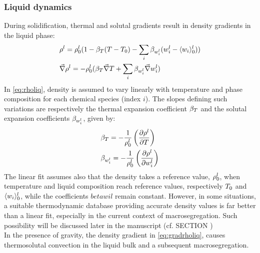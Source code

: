 \subsubsection*{Liquid dynamics}
During solidification, thermal and solutal gradients result in density gradients in the liquid phase: 
\begin{subequations}
\begin{align}
\label{eq:rholiq}
& \rho^l = \rho_{0}^{l} ( 1 - \beta_T (T - T_{0}) - \sum_{i} \beta_{w_i^l} (w_i^l - \langle w_i \rangle_{0}^l) )  \\ 
\label{eq:gradrholiq}
& \vec{\nabla}\rho^l = -\rho_{0}^{l} (  \beta_T \vec{\nabla} T + \sum_{i} \beta_{w_i^l} \vec{\nabla}w_i^l  )
\end{align}
\end{subequations}
%
In \cref{eq:rholiq}, density is assumed to vary linearly with temperature and phase composition 
for each chemical species (index $i$). The slopes defining such variations are respectively the 
thermal expansion coefficient $\beta_T$ and the solutal expansion coefficients $\beta_{w_i^l}$, given by:
%
\begin{subequations}
\begin{align}
\label{eq:betaT}
& \beta_T =  -\frac{1}{\rho_{0}^{l}} \left( \frac{\partial\rho^l}{\partial T} \right)  \\ 
\label{eq:betawil}
& \beta_{w_i^l} = -\frac{1}{\rho_{0}^{l}} \left( \frac{\partial \rho^l}{\partial w_i^l} \right)  
\end{align}
\end{subequations}
%
The linear fit assumes also that the density takes a reference value, $\rho_{0}^{l}$, when temperature 
and liquid composition reach reference values, respectively $T_{0}$ and $\langle w_i \rangle_{0}^l$, while the
coefficients $betawil$ remain constant. However, in some 
situations, a suitable thermodynamic database providing accurate density values is far better than a 
linear fit, especially in the current context of macrosegregation. 
Such possibility will be discussed later in the manuscript (cf. SECTION )\\ %
In the presence of gravity, the density gradient in \cref{eq:gradrholiq}, causes thermosolutal convection 
in the liquid bulk and a subsequent macrosegregation.
%
% 
